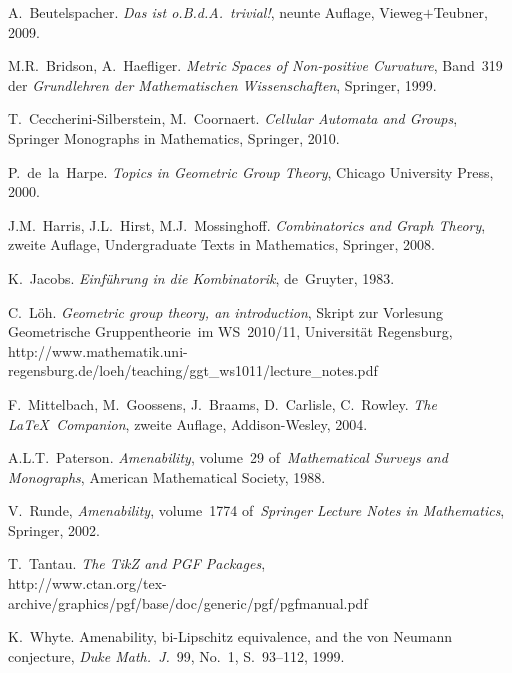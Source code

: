 \documentclass[a4paper,twoside,DIV8,10pt]{scrartcl}
\theoremstyle{definition}
\begin{document}
\begin{thebibliography}{99}

     A.~Beutelspacher. \emph{Das ist o.B.d.A.\
        trivial!}, neunte Auflage, Vie\-weg$+$Teub\-ner, 2009.

      M.R.~Bridson, A.~Haefliger. 
      \emph{Metric Spaces of Non-positive Curvature},
      Band~319 der \emph{Grundlehren der Mathematischen
        Wissenschaften}, Springer, 1999.

   T.~Ceccherini-Silberstein,
    M.~Coornaert. \emph{Cellular Automata and Groups}, Springer
    Monographs in Mathematics, Springer, 2010.

    P.~de~la~Harpe.
      \emph{Topics in Geometric Group Theory}, 
      Chicago University Press, 2000.


     J.M.~Harris, J.L.~Hirst,
      M.J.~Mossinghoff. \emph{Combinatorics and Graph Theory}, zweite
      Auflage, Undergraduate Texts in Mathematics, Springer, 2008.


     K.~Jacobs. \emph{Einf\"uhrung in die Kombinatorik},
      de~Gruyter, 1983.

     C.~L\"oh. \emph{Geometric group theory, an
        introduction}, Skript zur Vorlesung \glqq Geometrische
      Gruppentheorie\grqq\ im WS~2010/11, Universit\"at Regensburg,\\ 
      \textsf{http://www.mathematik.uni-regensburg.de/loeh/teaching/ggt\_ws1011/lecture\_notes.pdf}

     F.~Mittelbach, M.~Goossens, J.~Braams,
      D.~Carlisle, C.~Rowley. \emph{The \LaTeX\ Companion}, zweite
      Auflage, Addison-Wesley, 2004.

      A.L.T.~Paterson. \emph{Amenability}, 
      volume~29 of~\emph{Mathematical Surveys and Mono\-graphs}, American
      Mathematical Society, 1988.

      V.~Runde, \emph{Amenability}, volume~1774 of~\emph{Springer
        Lecture Notes in Mathematics}, Springer, 2002.

        T.~Tantau. \emph{The {\normalfont Ti\textit{k}Z} and
          {\normalfont PGF} Packages}, 
        \\
        \textsf{http://www.ctan.org/tex-archive/graphics/pgf/base/doc/generic/pgf/pgfmanual.pdf} 

    K.~Whyte. Amenability, bi-Lipschitz equivalence,
      and the von Neumann conjecture, \emph{Duke Math.~J.}~99, No.~1, 
      S.~93--112, 1999.

\end{thebibliography}

\end{document}
